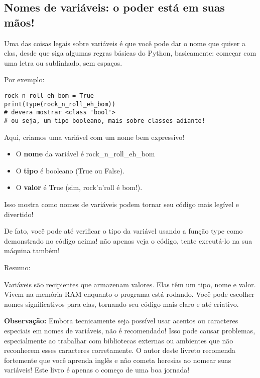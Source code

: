 \documentclass[12pt]{book}
\begin{document}
	\subsection{Nomes de variáveis: o poder está em suas mãos!}
	
	Uma das coisas legais sobre variáveis é que você pode dar o nome que quiser a elas, desde que siga algumas regras básicas do Python, basicamente: começar com uma letra ou sublinhado, sem espaços.
	
	Por exemplo:
	
	\begin{lstlisting}[caption={exemplo de variável}] 
rock_n_roll_eh_bom = True
print(type(rock_n_roll_eh_bom))
# devera mostrar <class 'bool'>
# ou seja, um tipo booleano, mais sobre classes adiante!
\end{lstlisting}
	
	
	Aqui, criamos uma variável com um nome bem expressivo!
	
	\begin{itemize}
		\item O \textbf{nome} da variável é rock\_n\_roll\_eh\_bom
		\item O \textbf{tipo} é booleano (True ou False).
		\item O \textbf{valor} é True (sim, rock'n'roll é bom!).
	\end{itemize}
	
	Isso mostra como nomes de variáveis podem tornar seu código mais legível e divertido!
	
	De fato, você pode até verificar o tipo da variável usando a função type\(\) como demonstrado no código acima! não apenas veja o código, tente executá-lo na sua máquina também!
	
	Resumo:
	
	Variáveis são recipientes que armazenam valores.
	Elas têm um tipo, nome e valor. Vivem na memória RAM enquanto o programa está rodando.
	Você pode escolher nomes significativos para elas, tornando seu código mais claro e até criativo.
	
	\textbf{Observação:} Embora tecnicamente seja possível usar acentos ou caracteres especiais em nomes de variáveis, não é recomendado! Isso pode causar problemas, especialmente ao trabalhar com bibliotecas externas ou ambientes que não reconhecem esses caracteres corretamente. O autor deste livreto recomenda fortemente que você aprenda inglês e não cometa heresias ao nomear suas variáveis! Este livro é apenas o começo de uma boa jornada!
	
\end{document}

